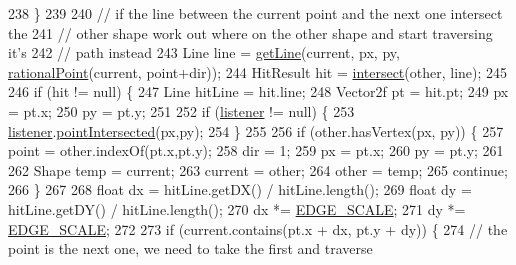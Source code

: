 \begin{DoxyCode}
238             \}
239 
240             \textcolor{comment}{// if the line between the current point and the next one intersect the}
241             \textcolor{comment}{// other shape work out where on the other shape and start traversing it's }
242             \textcolor{comment}{// path instead}
243             Line line = \mbox{\hyperlink{classorg_1_1newdawn_1_1slick_1_1geom_1_1_geom_util_a2db7a3e6a367a8dae2a86da8366afcd9}{getLine}}(current, px, py, \mbox{\hyperlink{classorg_1_1newdawn_1_1slick_1_1geom_1_1_geom_util_a6873a13095272143ffefcd31950b12fe}{rationalPoint}}(current, point+dir));
244             HitResult hit = \mbox{\hyperlink{classorg_1_1newdawn_1_1slick_1_1geom_1_1_geom_util_aff4ddf8d6df7cd84c49ec546d098357a}{intersect}}(other, line);
245             
246             \textcolor{keywordflow}{if} (hit != null) \{
247                 Line hitLine = hit.line;
248                 Vector2f pt = hit.pt;
249                 px = pt.x;
250                 py = pt.y;
251                 
252                 \textcolor{keywordflow}{if} (\mbox{\hyperlink{classorg_1_1newdawn_1_1slick_1_1geom_1_1_geom_util_a322b4fbea4e3b04b040c81c1322809bb}{listener}} != null) \{
253                     \mbox{\hyperlink{classorg_1_1newdawn_1_1slick_1_1geom_1_1_geom_util_a322b4fbea4e3b04b040c81c1322809bb}{listener}}.\mbox{\hyperlink{interfaceorg_1_1newdawn_1_1slick_1_1geom_1_1_geom_util_listener_aac2e6eb21b135b8af600cbd2fa0b1402}{pointIntersected}}(px,py);
254                 \}
255                 
256                 \textcolor{keywordflow}{if} (other.hasVertex(px, py)) \{
257                     point = other.indexOf(pt.x,pt.y);
258                     dir = 1;
259                     px = pt.x;
260                     py = pt.y;
261                     
262                     Shape temp = current;
263                     current = other;
264                     other = temp;
265                     \textcolor{keywordflow}{continue};
266                 \}
267                 
268                 \textcolor{keywordtype}{float} dx = hitLine.getDX() / hitLine.length();
269                 \textcolor{keywordtype}{float} dy = hitLine.getDY() / hitLine.length();
270                 dx *= \mbox{\hyperlink{classorg_1_1newdawn_1_1slick_1_1geom_1_1_geom_util_a249ee70d4c9395cdad063bb34a796864}{EDGE\_SCALE}};
271                 dy *= \mbox{\hyperlink{classorg_1_1newdawn_1_1slick_1_1geom_1_1_geom_util_a249ee70d4c9395cdad063bb34a796864}{EDGE\_SCALE}};
272                 
273                 \textcolor{keywordflow}{if} (current.contains(pt.x + dx, pt.y + dy)) \{
274                     \textcolor{comment}{// the point is the next one, we need to take the first and traverse}

\end{DoxyCode}
